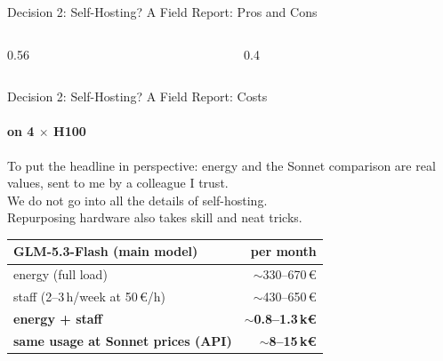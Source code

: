\documentclass[aspectratio=169]{beamer}
\begin{document}
\begin{frame}[shrink=0]{Decision 2: Self-Hosting? A Field Report: Pros and Cons}
\begin{columns}[T,onlytextwidth]
\begin{column}{0.56\textwidth}
{\begin{itemize}
      \end{itemize}}
    \end{column}
    \begin{column}{0.4\textwidth}
    \end{column}
  \end{columns}
  \vfill
\end{frame}

\begin{frame}[shrink=0]{Decision 2: Self-Hosting? A Field Report: Costs}
  \framesubtitle{on 4 $\times$ H100}
  \vspace{4pt}
  {\small
    To put the headline in perspective: energy and the Sonnet comparison are real values, sent to me by a colleague I trust.\\
    We do not go into all the details of self-hosting.\\
    Repurposing hardware also takes skill and neat tricks.
  \par}
  \vspace{12pt}
  {\large
  \renewcommand{\arraystretch}{1.08}
  \begin{tabular*}{\textwidth}{@{\extracolsep{\fill}}lr@{}}
    \textbf{GLM-5.3-Flash (main model)} & \textbf{per month} \\ \hline
    energy (full load) & $\sim$330--670\,\euro{} \\
    staff (2--3\,h/week at 50\,\euro{}/h) & $\sim$430--650\,\euro{} \\ \hline
    \textbf{energy + staff} & \textbf{$\sim$0.8--1.3\,k\euro{}} \\
    \textbf{same usage at Sonnet prices (API)} & \textbf{$\sim$8--15\,k\euro{}} \\
  \end{tabular*}\par}
  \vspace{12pt}
  \vfill
\end{frame}
\endgroup
\end{document}
